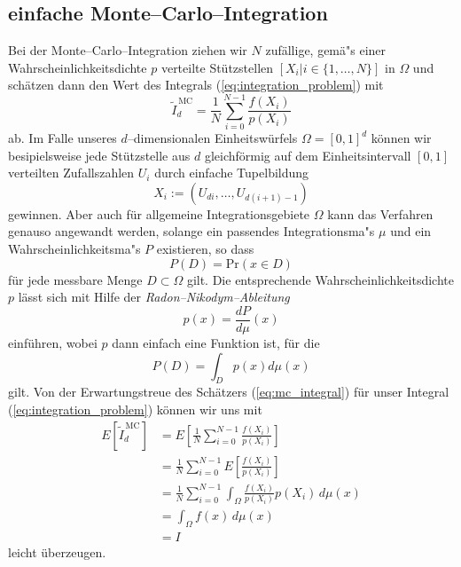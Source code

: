 	\subsection{einfache Monte--Carlo--Integration}
	Bei der Monte--Carlo--Integration ziehen wir $N$ zufällige, gemä"s einer Wahrscheinlichkeitsdichte $p$ verteilte Stützstellen $[X_i|i\in\{1,\dots,N\}]$ in $\Omega$ und schätzen dann den Wert des Integrals (\ref{eq:integration_problem}) mit
	\begin{equation}
		{\tilde I}_d^{\,\text{MC}}=\frac{1}{N}\sum_{i=0}^{N-1} \frac{f(X_i)}{p(X_i)}
		\label{eq:mc_integral}
	\end{equation}
	ab. Im Falle unseres $d$--dimensionalen Einheitswürfels $\Omega=[0,1]^d$ können wir besipielsweise jede Stützstelle aus $d$ gleichförmig auf dem Einheitsintervall $[0,1]$ verteilten Zufallszahlen $U_i$ durch einfache Tupelbildung
	$$X_i:=(U_{d i},\dots,U_{d(i+1)-1})$$
	gewinnen. Aber auch für allgemeine Integrationsgebiete $\Omega$ kann das Verfahren genauso angewandt werden, solange ein passendes Integrationsma"s $\mu$ und ein Wahrscheinlichkeitsma"s $P$ existieren, so dass $$P(D)=\text{Pr}(x\in D)$$ für jede messbare Menge $D\subset\Omega$ gilt. Die entsprechende Wahrscheinlichkeitsdichte $p$ lässt sich mit Hilfe der {\em Radon--Nikodym--Ableitung} $$p(x)=\frac{dP}{d\mu}(x)$$
	einführen, wobei $p$ dann einfach eine Funktion ist, für die $$P(D)=\int_D p(x)d\mu(x)$$ gilt.
	Von der Erwartungstreue des Schätzers (\ref{eq:mc_integral}) für unser Integral (\ref{eq:integration_problem}) können wir uns mit \citep[][2.4]{Veach:1997p9136}
	\begin{align*}
		E[{\tilde I}_d^{\,\text{MC}}] &=E\left[\frac{1}{N}\sum_{i=0}^{N-1}\frac{f(X_i)}{p(X_i)}\right] \\
			&= \frac{1}{N}\sum_{i=0}^{N-1}E\left[\frac{f(X_i)}{p(X_i)}\right] \\
			&= \frac{1}{N}\sum_{i=0}^{N-1}\int_\Omega \frac{f(X_i)}{p(X_i)}p(X_i)\,d\mu(x) \\
			&= \int_\Omega f(x)\,d\mu(x)\\
			&= I
	\end{align*}
	leicht überzeugen.
	
